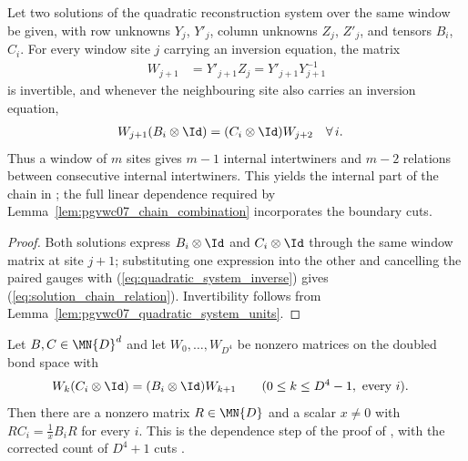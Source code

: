 \begin{lemma}
    \label{lem:pgvwc07_solution_chain}
    \leanok
    Let two solutions of the quadratic reconstruction system over the same
    window be given, with row unknowns $Y_j$, $Y'_j$, column unknowns $Z_j$,
    $Z'_j$, and tensors $B_i$, $C_i$. For every window site $j$ carrying an
    inversion equation, the matrix
    \begin{align}
        W_{j+1} & = Y'_{j+1}Z_j = Y'_{j+1}Y_{j+1}^{-1}
        \label{eq:solution_chain_intertwiner}
    \end{align}
    is invertible, and whenever the neighbouring site also carries an
    inversion equation,
    \begin{align}
        W_{j+1}(B_i\otimes\Id) & = (C_i\otimes\Id)W_{j+2} &  & \forall\, i.
        \label{eq:solution_chain_relation}
    \end{align}
    Thus a window of $m$ sites gives $m-1$ internal
    intertwiners and $m-2$ relations between consecutive internal
    intertwiners. This yields the internal part of the chain in
    \cite[Theorem~8]{PerezGarcia2007Matrix}; the full linear dependence required by
    Lemma~\ref{lem:pgvwc07_chain_combination} incorporates the boundary cuts.
\end{lemma}

\begin{proof}
    \leanok
    Both solutions express $B_i\otimes\Id$ and $C_i\otimes\Id$ through the
    same window matrix at site $j+1$; substituting one expression into the
    other and cancelling the paired gauges with
    (\ref{eq:quadratic_system_inverse}) gives
    (\ref{eq:solution_chain_relation}). Invertibility follows from
    Lemma~\ref{lem:pgvwc07_quadratic_system_units}.
\end{proof}

\begin{lemma}
    \label{lem:pgvwc07_complete_chain_intertwiner}
    \leanok
    Let $B,C\in\MN{D}^d$ and let $W_0,\ldots,W_{D^4}$ be nonzero matrices on
    the doubled bond space with
    \begin{align}
        W_k(C_i\otimes\Id) & =(B_i\otimes\Id)W_{k+1}
        \qquad(0\le k\le D^4-1,\ \text{every }i).
        \label{eq:pgvwc07_complete_chain_relation}
    \end{align}
    Then there are a nonzero matrix $R\in\MN{D}$ and a scalar $x\neq0$ with
    $RC_i=\tfrac1xB_iR$ for every $i$. This is the dependence step of the
    proof of \cite[Theorem~7]{PerezGarcia2007Matrix}, with the corrected
    count of $D^4+1$ cuts \cite{gap:pgvwc07_intertwiner_chain_off_by_one}.
\end{lemma}

